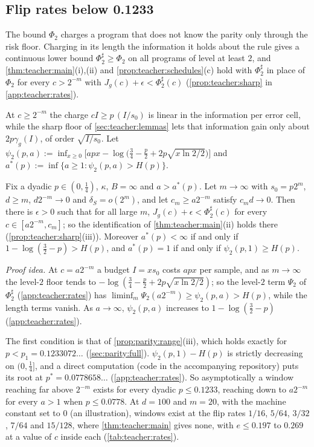 \subsection{Flip rates below 0.1233}\label{sec:teacher:rates}

The bound $\Phi_2$ charges a program that does not know the parity only through the risk floor. Charging in its length the information it holds about the rule gives a continuous lower bound $\Phi_2^\sharp\ge\Phi_2$ on all programs of level at least $2$, and \cref{thm:teacher:main}(i),(ii) and \cref{prop:teacher:schedules}(c) hold with $\Phi_2^\sharp$ in place of $\Phi_2$ for every $c>2^{-m}$ with $J_g(c)+\epsilon<\Phi_2^\sharp(c)$ (\cref{prop:teacher:sharp} in \cref{app:teacher:rates}).

At $c\ge2^{-m}$ the charge $cI\ge p\,(I/s_0)$ is linear in the information per error cell, while the sharp floor of \cref{sec:teacher:lemmas} lets that information gain only about $2p\gamma_g(I)$, of order $\sqrt{I/s_0}$. Let $\psi_2(p,a):=\inf_{x\ge0}\big[apx-\log\big(\tfrac34-\tfrac p2+2p\sqrt{x\ln2/2}\big)\big]$ and $a^*(p):=\inf\{a\ge1:\psi_2(p,a)>H(p)\}$.

\begin{proposition}\label{prop:teacher:rates}
Fix a dyadic $p\in(0,\frac14)$, $\kappa$, $B=\infty$ and $a>a^*(p)$. Let $m\to\infty$ with $s_0=p2^m$, $d\ge m$, $d2^{-m}\to0$ and $\delta_S=o(2^m)$, and let $c_m\ge a2^{-m}$ satisfy $c_md\to0$. Then there is $\epsilon>0$ such that for all large $m$, $J_g(c)+\epsilon<\Phi_2^\sharp(c)$ for every $c\in[a2^{-m},c_m]$; so the identification of \cref{thm:teacher:main}(ii) holds there (\cref{prop:teacher:sharp}(iii)). Moreover $a^*(p)<\infty$ if and only if $1-\log(\frac32-p)>H(p)$, and $a^*(p)=1$ if and only if $\psi_2(p,1)\ge H(p)$.
\end{proposition}

\emph{Proof idea.} At $c=a2^{-m}$ a budget $I=xs_0$ costs $apx$ per sample, and as $m\to\infty$ the level-$2$ floor tends to $-\log(\frac34-\frac p2+2p\sqrt{x\ln2/2})$; so the level-$2$ term $\Psi_2$ of $\Phi_2^\sharp$ (\cref{app:teacher:rates}) has $\liminf_m\Psi_2(a2^{-m})\ge\psi_2(p,a)>H(p)$, while the length terms vanish. As $a\to\infty$, $\psi_2(p,a)$ increases to $1-\log(\frac32-p)$ (\cref{app:teacher:rates}).

The first condition is that of \cref{prop:parity:range}(iii), which holds exactly for $p<p_1=0.1233072\ldots$ (\cref{sec:parity:full}). $\psi_2(p,1)-H(p)$ is strictly decreasing on $(0,\frac14]$, and a direct computation (code in the accompanying repository) puts its root at $p^*=0.0778658\ldots$ (\cref{app:teacher:rates}). So asymptotically a window reaching far above $2^{-m}$ exists for every dyadic $p\le0.1233$, reaching down to $a2^{-m}$ for every $a>1$ when $p\le0.0778$. At $d=100$ and $m=20$, with the machine constant set to $0$ (an illustration), windows exist at the flip rates $1/16$, $5/64$, $3/32$, $7/64$ and $15/128$, where \cref{thm:teacher:main} gives none, with $e\le0.197$ to $0.269$ at a value of $c$ inside each (\cref{tab:teacher:rates}).

